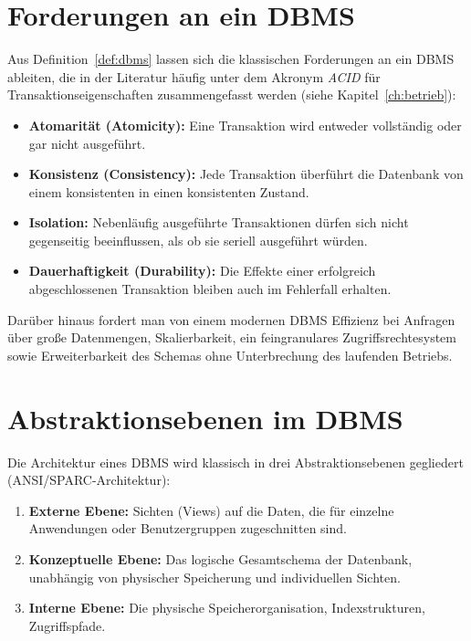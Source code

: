 ﻿\documentclass[a4paper,12pt]{report}
\theoremstyle{definition}
\theoremstyle{remark}
\begin{document}
\section{Forderungen an ein DBMS}

Aus Definition~\ref{def:dbms} lassen sich die klassischen Forderungen an
ein DBMS ableiten, die in der Literatur häufig unter dem Akronym
\emph{ACID} für Transaktionseigenschaften zusammengefasst werden
(siehe Kapitel~\ref{ch:betrieb}):

\begin{itemize}
  \item \textbf{Atomarität (Atomicity):} Eine Transaktion wird entweder
    vollständig oder gar nicht ausgeführt.
  \item \textbf{Konsistenz (Consistency):} Jede Transaktion überführt
    die Datenbank von einem konsistenten in einen konsistenten Zustand.
  \item \textbf{Isolation:} Nebenläufig ausgeführte Transaktionen
    dürfen sich nicht gegenseitig beeinflussen, als ob sie seriell
    ausgeführt würden.
  \item \textbf{Dauerhaftigkeit (Durability):} Die Effekte einer
    erfolgreich abgeschlossenen Transaktion bleiben auch im Fehlerfall
    erhalten.
\end{itemize}

Darüber hinaus fordert man von einem modernen DBMS Effizienz bei
Anfragen über große Datenmengen, Skalierbarkeit, ein feingranulares
Zugriffsrechtesystem sowie Erweiterbarkeit des Schemas ohne
Unterbrechung des laufenden Betriebs.

\section{Abstraktionsebenen im DBMS}

Die Architektur eines DBMS wird klassisch in drei Abstraktionsebenen
gegliedert (ANSI/SPARC-Architektur):

\begin{enumerate}
  \item \textbf{Externe Ebene:} Sichten (Views) auf die Daten, die für
    einzelne Anwendungen oder Benutzergruppen zugeschnitten sind.
  \item \textbf{Konzeptuelle Ebene:} Das logische Gesamtschema der
    Datenbank, unabhängig von physischer Speicherung und individuellen
    Sichten.
  \item \textbf{Interne Ebene:} Die physische Speicherorganisation,
    Indexstrukturen, Zugriffspfade.
\end{enumerate}
\end{document}
